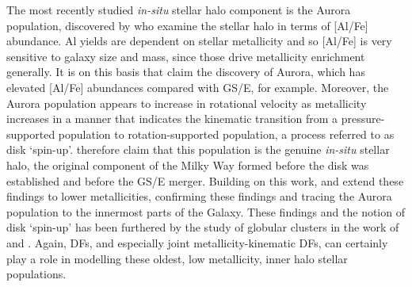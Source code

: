 The most recently studied \textit{in-situ} stellar halo component is the Aurora population, discovered by \textcite{belokurov22} who examine the stellar halo in terms of [Al/Fe] abundance. Al yields are dependent on stellar metallicity and so [Al/Fe] is very sensitive to galaxy size and mass, since those drive metallicity enrichment generally. It is on this basis that \textcite{belokurov22} claim the discovery of Aurora, which has elevated [Al/Fe] abundances compared with GS/E, for example. Moreover, the Aurora population appears to increase in rotational velocity as metallicity increases in a manner that indicates the kinematic transition from a pressure-supported population to rotation-supported population, a process referred to as disk `spin-up'. \textcite{belokurov22} therefore claim that this population is the genuine \textit{in-situ} stellar halo, the original component of the Milky Way formed before the disk was established and before the GS/E merger. Building on this work, \textcite{conroy22} and \textcite{rix22} extend these findings to lower metallicities, confirming these findings and tracing the Aurora population to the innermost parts of the Galaxy. These findings and the notion of disk `spin-up' has been furthered by the study of globular clusters in the work of \textcite{belokurov23a} and \textcite{belokurov24}. Again, DFs, and especially joint metallicity-kinematic DFs, can certainly play a role in modelling these oldest, low metallicity, inner halo stellar populations.